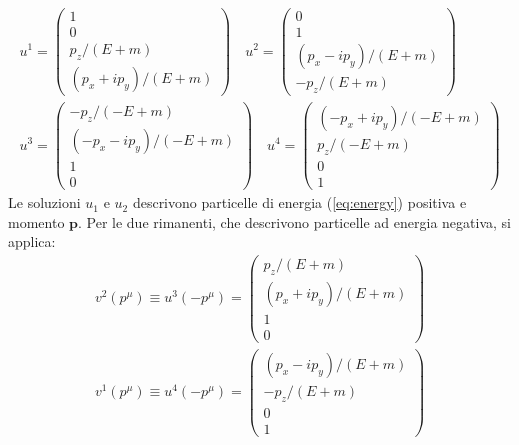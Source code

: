 \documentclass{subnucbo}
\begin{document}
\begin{equation}
        \begin{align}
                u ^ { 1 } = \left( \begin{array} { c } { 1 } \\ { 0 } \\ { p _ { z } / ( E + m ) } \\ { \left( p _ { x } + i p _ { y } \right) / ( E + m ) } \end{array} \right) \quad u ^ { 2 } = \left( \begin{array} { c } { 0 } \\ { 1 } \\ { \left( p _ { x } - i p _ { y } \right) / ( E + m ) } \\ { - p _ { z } / ( E + m ) } \end{array} \right) \\ u ^ { 3 } = \left( \begin{array} { c } { - p _ { z } / ( - E + m ) } \\ { \left( - p _ { x } - i p _ { y } \right) / ( - E + m ) } \\ { 1 } \\ { 0 } \end{array} \right) \quad u ^ { 4 } = \left( \begin{array} { c } { \left( - p _ { x } + i p _ { y } \right) / ( - E + m ) } \\ { p _ { z } / ( - E + m ) } \\ { 0 } \\ { 1 } \end{array} \right)
        \end{align}
        \label{eq:u1u2u3u4}
\end{equation}
Le soluzioni $u_{1}$ e $u_{2}$ descrivono particelle di energia (\ref{eq:energy}) positiva e momento $\boldsymbol{p}$. Per le due rimanenti, che descrivono particelle ad energia negativa, si applica:
\begin{equation}
        \begin{align}
                v ^ { 2 } \left( p ^ { \mu } \right) \equiv u ^ { 3 } \left( - p ^ { \mu } \right) = \left( \begin{array} { c } { p _ { z } / ( E + m ) } \\ { \left( p _ { x } + i p _ { y } \right) / ( E + m ) } \\ { 1 } \\ { 0 } \end{array} \right) \\ v ^ { 1 } \left( p ^ { \mu } \right) \equiv u ^ { 4 } \left( - p ^ { \mu } \right) = \left( \begin{array} { c } { \left( p _ { x } - i p _ { y } \right) / ( E + m ) } \\ { - p _ { z } / ( E + m ) } \\ { 0 } \\ { 1 } \end{array} \right)
        \end{align}
        \label{eq:v1v2}
\end{equation}
\end{document}
